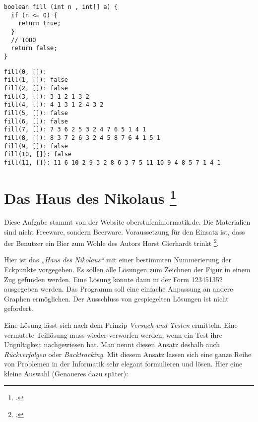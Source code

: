 \documentclass{lehramt-informatik-haupt}
\begin{document}
\begin{verbatim}
boolean fill (int n , int[] a) {
  if (n <= 0) {
    return true;
  }
  // TODO
  return false;
}
\end{verbatim}


\begin{verbatim}
fill(0, []):
fill(1, []): false
fill(2, []): false
fill(3, []): 3 1 2 1 3 2
fill(4, []): 4 1 3 1 2 4 3 2
fill(5, []): false
fill(6, []): false
fill(7, []): 7 3 6 2 5 3 2 4 7 6 5 1 4 1
fill(8, []): 8 3 7 2 6 3 2 4 5 8 7 6 4 1 5 1
fill(9, []): false
fill(10, []): false
fill(11, []): 11 6 10 2 9 3 2 8 6 3 7 5 11 10 9 4 8 5 7 1 4 1
\end{verbatim}

%

\section{Das Haus des Nikolaus
\footcite[Seite 2-3]{aud:ab:3}
}

\begin{exkurs}[Quelle]
Diese Aufgabe stammt von der Website oberstufeninformatik.de. Die
Materialien sind nicht Freeware, sondern Beerware. Voraussetzung für
den Einsatz ist, dass der Benutzer ein Bier zum Wohle des Autors Horst
Gierhardt trinkt \footcite{net:pdf:nikolaus}.
\end{exkurs}

\noindent
Hier ist das \emph{„Haus des Nikolaus“} mit einer bestimmten
Nummerierung der Eckpunkte vorgegeben. Es sollen alle Lösungen zum
Zeichnen der Figur in einem Zug gefunden werden. Eine Lösung könnte dann
in der Form 123451352 ausgegeben werden. Das Programm soll eine einfache
Anpassung an andere Graphen ermöglichen. Der Ausschluss von gespiegelten
Lösungen ist nicht gefordert.

Eine Lösung lässt sich nach dem Prinzip \emph{Versuch und Testen}
ermitteln. Eine vermutete Teillösung muss wieder verworfen werden, wenn
ein Test ihre Ungültigkeit nachgewiesen hat. Man nennt diesen Ansatz
deshalb auch \emph{Rückverfolgen} oder \emph{Backtracking}. Mit diesem
Ansatz lassen sich eine ganze Reihe von Problemen in der Informatik sehr
elegant formulieren und lösen. Hier eine kleine Auswahl (Genaueres dazu
später):
\end{document}
